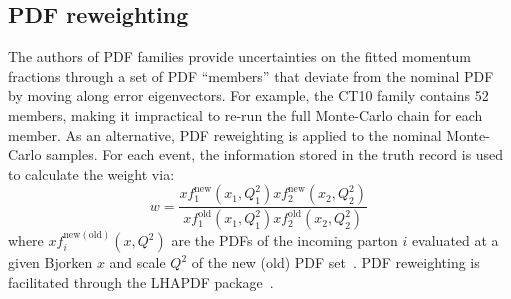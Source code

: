 \subsection{PDF reweighting}

The authors of PDF families provide uncertainties on the fitted momentum fractions through a set of PDF ``members'' that deviate from the nominal PDF by moving along error eigenvectors. For example, the CT10 family contains 52 members, making it impractical to re-run the full Monte-Carlo chain for each member.
As an alternative, PDF reweighting is applied to the nominal Monte-Carlo samples. For each event, the information stored in the truth record is used to calculate the weight via:
\begin{equation}
  w = \frac{xf_1^\mathrm{new}(x_1, Q^2_1) xf_2^\mathrm{new}(x_2, Q^2_2) }{xf_1^\mathrm{old}(x_1, Q^2_1) xf_2^\mathrm{old}(x_2, Q^2_2)}\,
\end{equation}
where $xf_i^\mathrm{new(old)}(x,Q^2)$ are the PDFs of the incoming
parton $i$ evaluated at a given Bjorken $x$ and scale $Q^2$ of the new
(old) PDF set~\cite{Bourilkov:2006cj}.
PDF reweighting is facilitated through the LHAPDF package~\cite{Whalley:2005nh}.
